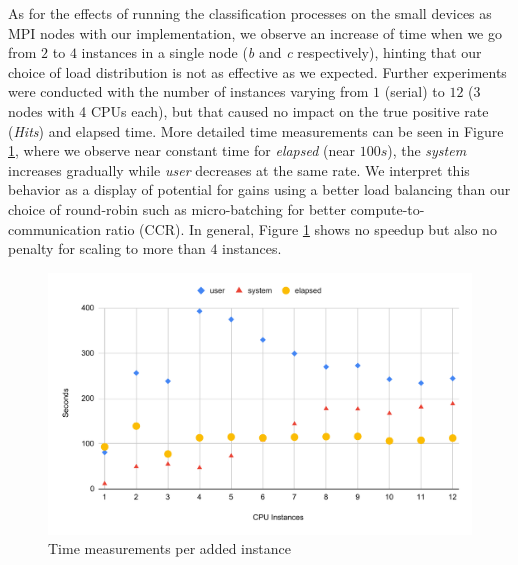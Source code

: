 As for the effects of running the classification processes on the small devices as MPI nodes with our implementation, we observe
an increase of time when we go from $2$ to $4$ instances in a single node
(\emph{b} and \emph{c} respectively), hinting that our choice of load
distribution is not as effective as we expected.
Further experiments were conducted with the number of instances varying from $1$ (serial) to
$12$ (3 nodes with 4 CPUs each), but that caused no impact on the true positive rate (\emph{Hits}) and elapsed time.
More detailed time measurements can be seen in Figure \ref{fig:speedup},
where we observe near constant time for \emph{elapsed} (near $100s$),
the \emph{system} increases gradually while \emph{user} decreases at the same rate.
We interpret this behavior as a display of potential for gains using a better
load balancing than our choice of round-robin such as micro-batching for better
compute-to-communication ratio (CCR).
In general, Figure \ref{fig:speedup} shows no speedup but also no penalty for
scaling to more than $4$ instances.







\begin{figure}[hbt]
  \centering
  \includegraphics[width=\whencolumns{0.6}{1}\linewidth,page=1]{experiments/speedup-clean.pdf}
  \caption{Time measurements per added instance}
  \label{fig:speedup}
\end{figure}

